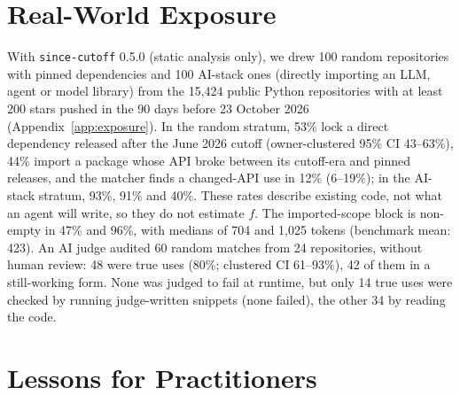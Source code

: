 \documentclass[11pt]{article}
\newcommand{\tool}{\texttt{since-cutoff}\xspace}
\begin{document}
\section{Real-World Exposure}
\label{sec:exposure}

With \tool 0.5.0 (static analysis only), we drew 100 random repositories with pinned dependencies and 100 AI-stack ones (directly importing an LLM, agent or model library) from the 15,424 public Python repositories with at least 200 stars pushed in the 90 days before 23 October 2026 (Appendix~\ref{app:exposure}).
In the random stratum, 53\% lock a direct dependency released after the June 2026 cutoff (owner-clustered 95\% CI 43--63\%), 44\% import a package whose API broke between its cutoff-era and pinned releases, and the matcher finds a changed-API use in 12\% (6--19\%); in the AI-stack stratum, 93\%, 91\% and 40\%.
These rates describe existing code, not what an agent will write, so they do not estimate $f$.
The imported-scope block is non-empty in 47\% and 96\%, with medians of 704 and 1,025 tokens (benchmark mean: 423).
An AI judge audited 60 random matches from 24 repositories, without human review: 48 were true uses (80\%; clustered CI 61--93\%), 42 of them in a still-working form. None was judged to fail at runtime, but only 14 true uses were checked by running judge-written snippets (none failed), the other 34 by reading the code.

\section{Lessons for Practitioners}
\label{sec:lessons}
\end{document}
